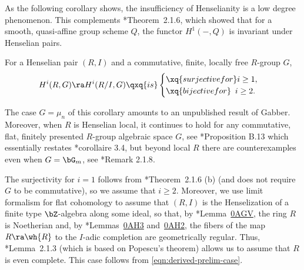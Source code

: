 As the following corollary shows, the insufficiency of Henselianity is a low degree phenomenon.
This complements \cite{BC19}*{Theorem~2.1.6}, which showed that for a smooth, quasi-affine group scheme $Q$, the functor $H^1(-, Q)$ is invariant under Henselian pairs.

\bcor {}
For a Henselian pair $(R, I)$ and a commutative, finite, locally free $R$-group $G$,
\[
H^i(R, G) \ra H^i(R/I, G) \qxq{is} \begin{cases}\xq{surjective for} i \ge 1, \\ \xq{bijective for}\ \, i \ge 2.  \end{cases}
\]
\ecor

The case $G = \mu_n$ of this corollary amounts to an unpublished result of Gabber. Moreover, when $R$ is Henselian local, it continues to hold for any commutative, flat, finitely presented $R$-group algebraic space $G$, see \cite{topology-torsors}*{Proposition B.13} which essentially restates \cite{Toe11}*{corollaire 3.4}, but beyond local $R$ there are counterexamples even when $G = \bG_m$, see \cite{BC19}*{Remark 2.1.8}.

\bpf
The surjectivity for $i = 1$ follows from \cite{BC19}*{Theorem~2.1.6 (b)} (and does not require $G$ to be commutative), so we assume that $i \ge 2$. Moreover, we use limit formalism for flat cohomology to assume that $(R, I)$ is the Henselization of a finite type $\bZ$-algebra along some ideal, so that, by \cite{SP}*{Lemma~\href{https://stacks.math.columbia.edu/tag/0AGV}{0AGV}}, the ring $R$ is Noetherian and, by \cite{SP}*{Lemmas~\href{https://stacks.math.columbia.edu/tag/0AH3}{0AH3} and~\href{https://stacks.math.columbia.edu/tag/0AH2}{0AH2}}, the fibers of the map $R \ra \wh{R}$ to the $I$-adic completion are geometrically regular. Thus, \cite{BC19}*{Lemma~2.1.3} (which is based on Popescu's theorem) allows us to assume that $R$ is even complete. This case follows from \eqref{eqn:derived-prelim-case}.
\epf



